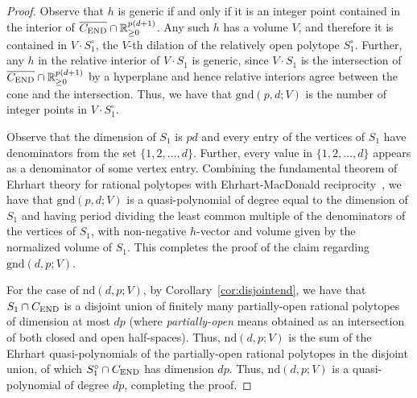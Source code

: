 \documentclass[12pt]{amsart}
\theoremstyle{definition}
\numberwithin{equation}{section}
\renewcommand\>{\rangle}
\newcommand\<{\langle}
\newcommand\0{\mathbf{0}}
\newcommand\RR{\mathbb{R}}
\newcommand{\CEND}{C_\textnormal{END}}
\newcommand\nd{\mathrm{nd}}
\newcommand\gnd{\mathrm{gnd}}
\begin{document}
\begin{proof}
Observe that $h$ is generic if and only if it is an integer point contained in the interior of $ \overline{\CEND}\cap \RR_{\geq 0}^{p(d+1)}$.
Any such $h$ has a volume $V$, and therefore it is contained in $V\cdot S_1^\circ$, the $V$-th dilation of the relatively open polytope $S_1^\circ$.
Further, any $h$ in the relative interior of $V\cdot S_1$ is generic, since $V\cdot S_1$ is the intersection of $ \overline{\CEND}\cap \RR_{\geq 0}^{p(d+1)}$ by a hyperplane and hence relative interiors agree between the cone and the intersection.
Thus, we have that $\gnd(p,d;V)$ is the number of integer points in $V\cdot S_1^\circ$.

Observe that the dimension of $S_1$ is $pd$ and every entry of the vertices of $S_1$ have denominators from the set $\{1,2,\ldots,d\}$.
Further, every value in $\{1,2,\ldots,d\}$ appears as a denominator of some vertex entry.
Combining the fundamental theorem of Ehrhart theory for rational polytopes with Ehrhart-MacDonald reciprocity~\cite{ccd}, we have that $\gnd(p,d;V)$ is a quasi-polynomial of degree equal to the dimension of $S_1$ and having period dividing the least common multiple of the denominators of the vertices of $S_1$, with non-negative $h$-vector and volume given by the normalized volume of $S_1$.
This completes the proof of the claim regarding $\gnd(d,p;V)$.

For the case of $\nd(d,p;V)$, by Corollary~\ref{cor:disjointend}, we have that $S_1\cap \CEND$ is a disjoint union of finitely many partially-open rational polytopes of dimension at most $dp$ (where \emph{partially-open} means obtained as an intersection of both closed and open half-spaces).
Thus, $\nd(d,p;V)$ is the sum of the Ehrhart quasi-polynomials of the partially-open rational polytopes in the disjoint union, of which $S_1^\circ \cap \CEND$ has dimension $dp$.
Thus, $\nd(d,p;V)$ is a quasi-polynomial of degree $dp$, completing the proof.
\end{proof}
\end{document}
